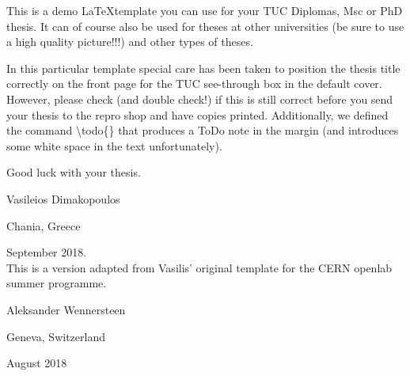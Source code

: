 This is a demo \LaTeX template you can use for your TUC Diplomas, Msc or PhD thesis. It can of course also be used for theses at other universities (be sure to use a high quality picture!!!) and other types of theses.

In this particular template special care has been taken to position the thesis title correctly on the front page for the TUC see-through box in the default cover. However, please check (and double check!) if this is still correct before you send your thesis to the repro shop and have copies printed. Additionally, we defined the command \textbackslash todo\{\} that produces a  ToDo note in the margin (and introduces some white space in the text unfortunately).

Good luck with your thesis.
\vspace{10pt}

Vasileios Dimakopoulos

Chania, Greece

September 2018.
\vspace{20pt}
\\
This is a version adapted from Vasilis' original template for the CERN openlab summer programme.

Aleksander Wennersteen

Geneva, Switzerland

August 2018